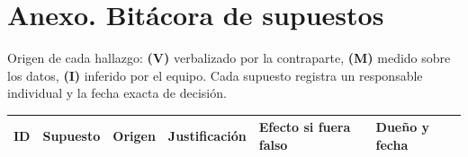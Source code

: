 
\section*{Anexo. Bitácora de supuestos}
\label{anexo:bitacora}

Origen de cada hallazgo: \textbf{(V)} verbalizado por la contraparte, \textbf{(M)} medido sobre los datos, \textbf{(I)} inferido por el equipo. Cada supuesto registra un responsable individual y la fecha exacta de decisión.

\setlength{\tabcolsep}{4pt}
\begin{longtable}{@{}>{\raggedright\arraybackslash}p{0.6cm} >{\raggedright\arraybackslash}p{2.8cm} c >{\raggedright\arraybackslash}p{3.9cm} >{\raggedright\arraybackslash}p{3.9cm} >{\raggedright\arraybackslash}p{2.1cm}@{}}
\toprule
\textbf{ID} & \textbf{Supuesto} & \textbf{Origen} & \textbf{Justificación} & \textbf{Efecto si fuera falso} & \textbf{Dueño y fecha} \\
\midrule
\endhead


\end{longtable}
